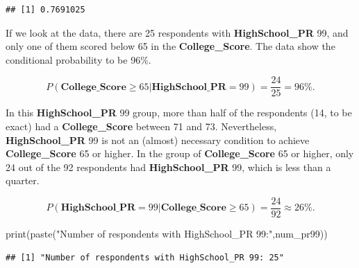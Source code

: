 \documentclass[
]{article}
\newenvironment{Shaded}{\begin{snugshade}}{\end{snugshade}}
\newcommand{\DecValTok}[1]{\textcolor[rgb]{0.00,0.00,0.81}{#1}}
\newcommand{\FunctionTok}[1]{\textcolor[rgb]{0.00,0.00,0.00}{#1}}
\newcommand{\NormalTok}[1]{#1}
\newcommand{\OtherTok}[1]{\textcolor[rgb]{0.56,0.35,0.01}{#1}}
\newcommand{\SpecialCharTok}[1]{\textcolor[rgb]{0.00,0.00,0.00}{#1}}
\newcommand{\StringTok}[1]{\textcolor[rgb]{0.31,0.60,0.02}{#1}}
\begin{document}
\begin{verbatim}
## [1] 0.7691025
\end{verbatim}

If we look at the data, there are 25 respondents with
\textbf{HighSchool\_PR} 99, and only one of them scored below 65 in the
\textbf{College\_Score}. The data show the conditional probability to be
96\%.

\[P(\textbf{College}\_\textbf{Score} \geq 65 | \textbf{HighSchool}\_\textbf{PR} = 99) = \dfrac{24}{25} = 96\%.\]

In this \textbf{HighSchool\_PR} 99 group, more than half of the
respondents (14, to be exact) had a \textbf{College\_Score} between 71
and 73. Nevertheless, \textbf{HighSchool\_PR} 99 is not an (almost)
necessary condition to achieve \textbf{College\_Score} 65 or higher. In
the group of \textbf{College\_Score} 65 or higher, only 24 out of the 92
respondents had \textbf{HighSchool\_PR} 99, which is less than a
quarter.

\[P(\textbf{HighSchool}\_\textbf{PR} = 99 | \textbf{College}\_\textbf{Score} \geq 65) = \dfrac{24}{92} \approx 26\%.\]

\begin{Shaded}
\end{Shaded}

\begin{Shaded}
\begin{Highlighting}[]
\FunctionTok{print}\NormalTok{(}\FunctionTok{paste}\NormalTok{(}\StringTok{"Number of respondents with HighSchool\_PR 99:"}\NormalTok{,num\_pr99))}
\end{Highlighting}
\end{Shaded}

\begin{verbatim}
## [1] "Number of respondents with HighSchool_PR 99: 25"
\end{verbatim}
\end{document}
